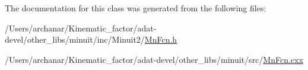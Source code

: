 The documentation for this class was generated from the following files\+:\begin{DoxyCompactItemize}
\item 
/\+Users/archanar/\+Kinematic\+\_\+factor/adat-\/devel/other\+\_\+libs/minuit/inc/\+Minuit2/\mbox{\hyperlink{adat-devel_2other__libs_2minuit_2inc_2Minuit2_2MnFcn_8h}{Mn\+Fcn.\+h}}\item 
/\+Users/archanar/\+Kinematic\+\_\+factor/adat-\/devel/other\+\_\+libs/minuit/src/\mbox{\hyperlink{adat-devel_2other__libs_2minuit_2src_2MnFcn_8cxx}{Mn\+Fcn.\+cxx}}\end{DoxyCompactItemize}

